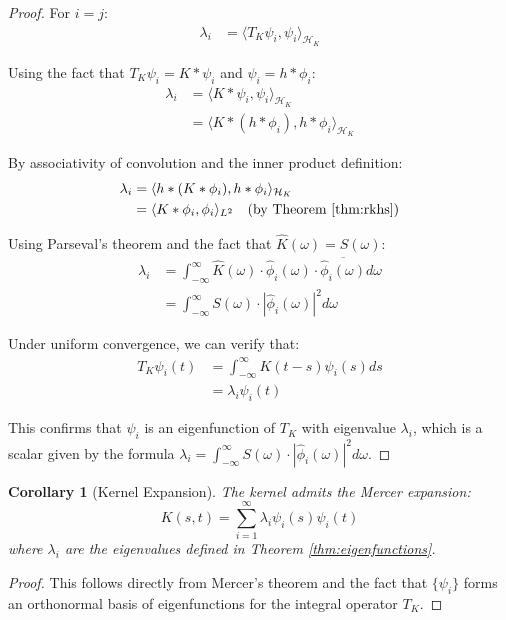 \documentclass{article}
\newtheorem{corollary}[theorem]{Corollary}
\begin{document}
\begin{proof}
For $i = j$:
\begin{align}
\lambda_i &= \langle T_K \psi_i, \psi_i \rangle_{\mathcal{H}_K}
\end{align}

Using the fact that $T_K \psi_i = K * \psi_i$ and $\psi_i = h * \phi_i$:
\begin{align}
\lambda_i &= \langle K * \psi_i, \psi_i \rangle_{\mathcal{H}_K}\\
&= \langle K * (h * \phi_i), h * \phi_i \rangle_{\mathcal{H}_K}
\end{align}

By associativity of convolution and the inner product definition:
\begin{align}
\lambda_i &= \langle h * (K * \phi_i), h * \phi_i \rangle_{\mathcal{H}_K}\\
&= \langle K * \phi_i, \phi_i \rangle_{L^2} \quad \text{(by Theorem \ref{thm:rkhs})}
\end{align}

Using Parseval's theorem and the fact that $\hat{K}(\omega) = S(\omega)$:
\begin{align}
\lambda_i &= \int_{-\infty}^{\infty} \hat{K}(\omega) \cdot \hat{\phi}_i(\omega) \cdot \overline{\hat{\phi}_i(\omega)} d\omega\\
&= \int_{-\infty}^{\infty} S(\omega) \cdot |\hat{\phi}_i(\omega)|^2 d\omega
\end{align}

Under uniform convergence, we can verify that:
\begin{align}
T_K \psi_i(t) &= \int_{-\infty}^{\infty} K(t-s) \psi_i(s) ds\\
&= \lambda_i \psi_i(t)
\end{align}

This confirms that $\psi_i$ is an eigenfunction of $T_K$ with eigenvalue $\lambda_i$, which is a scalar given by the formula $\lambda_i = \int_{-\infty}^{\infty} S(\omega) \cdot |\hat{\phi}_i(\omega)|^2 d\omega$.
\end{proof}

\begin{corollary}[Kernel Expansion]
The kernel admits the Mercer expansion:
\begin{equation}
K(s,t) = \sum_{i=1}^{\infty} \lambda_i \psi_i(s) \psi_i(t)
\end{equation}
where $\lambda_i$ are the eigenvalues defined in Theorem \ref{thm:eigenfunctions}.
\end{corollary}

\begin{proof}
This follows directly from Mercer's theorem and the fact that $\{\psi_i\}$ forms an orthonormal basis of eigenfunctions for the integral operator $T_K$.
\end{proof}
\end{document}
